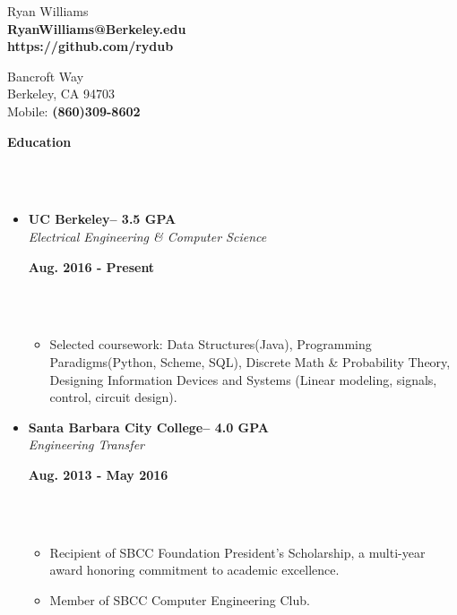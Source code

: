 \documentclass[a4paper,11pt]{article}
\newcommand{\isep}{-2 pt}
\newcommand{\lsep}{-0.2cm}
\newcommand{\resheading}[1]{{\small \colorbox{mygrey}{\begin{minipage}{0.975\textwidth}{\textbf{#1 \vphantom{p\^{E}}}}\end{minipage}}}}
\newcommand{\workexp}[4]{
\begin{minipage}[t]{7cm}
\begin{flushleft}
\textbf{#1} \\
\indent \emph{#2}\\
\end{flushleft}
\end{minipage}
\hfill
\begin{minipage}[t]{7cm}
\begin{flushright}
\textbf{#3} \\
\indent #4 \\
\end{flushright}
\end{minipage}
}
\begin{document}

\begin{minipage}[t]{7cm}
\begin{flushleft}
\Large{Ryan Williams} \\
\indent\textbf{RyanWilliams@Berkeley.edu} \\
\indent\textbf{https://github.com/rydub}\\
\end{flushleft}
\end{minipage}
\hfill
\begin{minipage}[t]{7cm}
\begin{flushright}
 Bancroft Way \\
\indent Berkeley, CA 94703 \\
\indent Mobile: \textbf{(860)309-8602} \\[\lsep]
\end{flushright}
\end{minipage}



\resheading{\textbf{Education} }\\[\lsep]
\\

\begin{itemize}
\item 
\workexp{UC Berkeley-- 3.5 GPA}{Electrical Engineering \& Computer Science}{Aug. 2016 - Present}{}
\\[-0.2cm]
	\begin{itemize}\itemsep \isep
	\item Selected coursework: Data Structures(Java), Programming Paradigms(Python, Scheme, SQL), Discrete Math \& Probability Theory, Designing Information Devices and Systems (Linear modeling, signals, control, circuit design).
	\end{itemize}
\end{itemize}
\begin{itemize}
\item 
\workexp{Santa Barbara City College-- 4.0 GPA}{Engineering Transfer}{Aug. 2013 - May 2016}{}
\\[-0.2cm]
	\begin{itemize}\itemsep \isep
	\item Recipient of SBCC Foundation President's Scholarship, a multi-year award honoring commitment to academic excellence.
	\item Member of SBCC Computer Engineering Club.
	\end{itemize}
\end{itemize}
\end{document}

